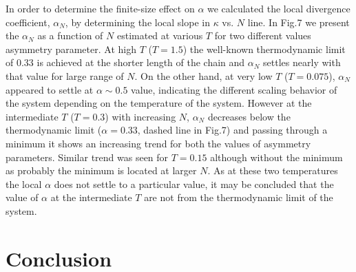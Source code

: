 \documentclass[aps,pre,reprint,groupedaddress]{revtex4-1}
\begin{document}
In order to determine the finite-size effect on $\alpha$ we calculated the local divergence coefficient, $\alpha_{N}$, by determining the local slope in $\kappa$ vs. $N$ line. In Fig.7 we present the $\alpha_N$ as a function of $N$ estimated at various $T$ for two different values asymmetry parameter. At high $T$ ($T=1.5$) the well-known thermodynamic limit of $0.33$ is achieved at the shorter length of the chain and $\alpha_N$ settles nearly with that value for large range of $N$.  On the other hand, at very low $T$ ($T=0.075$), $\alpha_N$ appeared to settle at $\alpha\sim0.5$ value, indicating the different scaling behavior of the system depending on the temperature of the system. However at the intermediate $T$ ($T=0.3$) with increasing $N$, $\alpha_N$ decreases below the thermodynamic limit ($\alpha=0.33$, dashed line in Fig.7) and passing through a minimum it shows an increasing trend for both the values of asymmetry parameters. Similar trend was seen for $T=0.15$ although without the minimum as probably the minimum is located at larger $N$. As at these two temperatures the local $\alpha$ does not settle to a particular value, it may be concluded that the value of $\alpha$ at the intermediate $T$ are not from the thermodynamic limit of the system. 

\section{Conclusion}  
\end{document}
